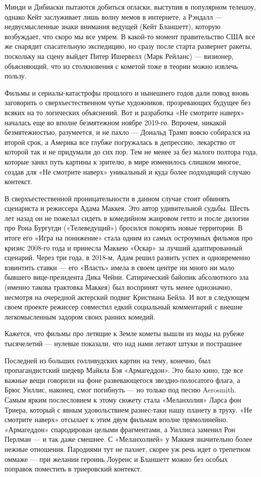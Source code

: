 Минди и Дибиаски пытаются добиться огласки, выступив в популярном телешоу, однако Кейт заслуживает лишь волну мемов в интернете, а Рэндалл — недвусмысленные знаки внимания ведущей (Кейт Бланшетт), которую возбуждает, что скоро мы все умрем. В какой-то момент правительство США все же снарядит спасательную экспедицию, но сразу после старта развернет ракеты, поскольку на сцену выйдет Питер Ишервелл (Марк Рейланс) — визионер, объясняющий, что из столкновения с кометой тоже в теории можно извлечь пользу.

Фильмы и сериалы-катастрофы прошлого и нынешнего годов дали повод вновь заговорить о сверхъестественном чутье художников, прозревающих будущее без всяких на то логических объяснений. Вот и разработка «Не смотрите наверх» началась еще во вполне безмятежном ноябре 2019-го. Впрочем, никакой безмятежностью, разумеется, и не пахло — Дональд Трамп вовсю собирался на второй срок, а Америка все глубже погружалась в депрессию, лекарство от которой так и не придумали до сих пор. Тем не менее за без малого полтора года, которые занял путь картины к зрителю, в мире изменилось слишком многое, создав для «Не смотрите наверх» уникальный и куда более подходящий случаю контекст.

В сверхъестественной проницательности в данном случае стоит обвинять сценариста и режиссера Адама Маккея. Это автор удивительной судьбы. Шесть лет назад он не пожелал сидеть в комедийном жанровом гетто и после дилогии про Рона Бургугди («Телеведущий») бросился покорять новые территории. В итоге его «Игра на понижение» стала одним из самых остроумных фильмов про кризис 2008-го года и принесла Маккею «Оскар» за лучший адаптированный сценарий. Через три года, в 2018-м, Адам решил развить успех и одновременно взвинтить ставки — его «Власть» имела в своем центре ни много ни мало бывшего вице-президента Дика Чейни. Сатирический байопик абсолютного зла (именно такова трактовка Маккея) был воспринят чуть менее однозначно, несмотря на очередной актерский подвиг Кристиана Бейла. И вот в следующем своем проекте режиссер совместил едкий социальный комментарий с внешне легкомысленным задором своих ранних комедий.

\begin{fancyquotes}
    Кажется, что фильмы про летящие к Земле кометы вышли из моды на рубеже тысячелетий — нулевые показали, что над нами летают штуки и пострашнее
\end{fancyquotes}

Последней из больших голливудских картин на тему, конечно, был пропагандистский шедевр Майкла Бэя «Армагеддон». Это было кино, где все важные вещи говорили на фоне развевающегося звездно-полосатого флага, а Брюс Уиллис, наконец, смог погибнуть — но только под песню Aerosmith. Самым ярким послесловием к этому сюжету стала «Меланхолия» Ларса фон Триера, который с явным удовольствием разнес-таки нашу планету в труху. «Не смотрите наверх» отсылает к этим двум фильмам вполне прямолинейно. «Армагеддон» спародирован целыми фрагментами, а Уиллиса заменил Рон Перлман — и так даже смешнее. С «Меланхолией» у Маккея значительно более нежные отношения. Пародиями тут не пахнет, скорее уж речь идет о трепетном оммаже — при желании героинь Лоуренс и Бланшетт можно без особых поправок поместить в триеровский контекст.

